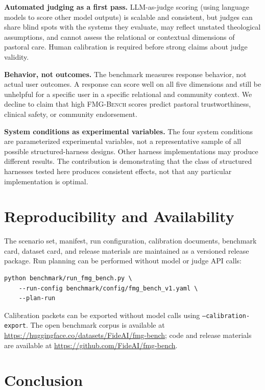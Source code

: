 \documentclass[11pt]{article}
\newcommand{\fmgb}{\textsc{FMG-Bench}}
\begin{document}
\textbf{Automated judging as a first pass.} LLM-as-judge scoring (using language
models to score other model outputs) is scalable and
consistent, but judges can share blind spots with the systems they evaluate, may
reflect unstated theological assumptions, and cannot assess the relational or
contextual dimensions of pastoral care. Human calibration is required before
strong claims about judge validity.

\textbf{Behavior, not outcomes.} The benchmark measures response behavior, not actual
user outcomes. A response can score well on all five dimensions and still be
unhelpful for a specific user in a specific relational and community context. We
decline to claim that high \fmgb{} scores predict pastoral trustworthiness, clinical
safety, or community endorsement.

\textbf{System conditions as experimental variables.} The four system conditions are
parameterized experimental variables, not a representative sample of all possible
structured-harness designs. Other harness implementations may produce different
results. The contribution is demonstrating that the class of structured
harnesses tested here produces consistent effects, not that any particular implementation
is optimal.

\section{Reproducibility and Availability}
\label{sec:reproducibility}

The scenario set, manifest, run configuration, calibration documents, benchmark card,
dataset card, and release materials are maintained as a versioned release package.
Run planning can be performed without model or judge API calls:

\begin{verbatim}
python benchmark/run_fmg_bench.py \
    --run-config benchmark/config/fmg_bench_v1.yaml \
    --plan-run
\end{verbatim}

Calibration packets can be exported without model calls using
\texttt{--calibration-export}. The open benchmark corpus is available at
\url{https://huggingface.co/datasets/FideAI/fmg-bench}; code and release
materials are available at \url{https://github.com/FideAI/fmg-bench}.

\section{Conclusion}
\label{sec:conclusion}
\end{document}
